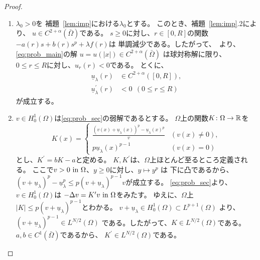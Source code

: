 \begin{proof}
 \begin{enumerate}[1.] \sage
  \item $\lambda_0 > 0$を
        補題~\ref{lem:imp}における$\lambda_0$とする。
        このとき、補題~\ref{lem:imp}.2により、
        $u \in C^{2+\alpha}(\bar{\Omega})$である。
        $s \geq 0$に対し、$r \in [0, R]$の関数
        $-a(r) s + b(r) s^p + \lambda f(r)$は
        単調減少である。したがって、\cite{MR544879}~より、
        \ref{eq:prob_main}の解
        $u = u(\lvert x \rvert) \in C^{2+\alpha}(\bar{\Omega})$
        は球対称解に限り、
        $0 \leq r \leq R$に対し、$u_r (r) < 0$である。
        とくに、
        \begin{align}
         \underline{u}_\lambda(r) & \in C^{2+ \alpha}([0, R]), 
          \label{eq:under_u_r} \\
         \underline{u}_\lambda^\prime(r) &< 0 \ \ (0 \leq r \leq R)
          \label{eq:under_u_r_prime}
        \end{align}
        が成立する。
  \item $v \in H_0^1(\Omega)$は\ref{eq:prob_sec}の弱解であるとする。
        $\Omega$上の関数$K \colon \Omega \to\mathbb{R}$を
        \begin{equation}
         K(x) = \begin{cases}
                 \displaystyle \frac{(v(x) + \underline{u}_\lambda(x))^p -
                 \underline{u}_\lambda(x)^p}{v} & ( v(x) \neq 0 ), \\
                 p \underline{u}_\lambda(x)^{p-1} & ( v(x) = 0 )
                \end{cases}
        \end{equation}
        とし、$K^\prime = b K - a$と定める。
        $K, K^\prime$は、$\Omega$上ほとんど至るところ定義される。
        ここで$v > 0 ~\text{in}~ \Omega$、$y \geq 0$に対し、$y \mapsto y^p$
        は
        下に凸であるから、
        $(v + \underline{u}_\lambda)^p - \underline{u}_\lambda^p \leq
        p(v+ \underline{u}_\lambda)^{p-1} v$が成立する。
        \ref{eq:prob_sec}より、
        $v \in H_0^1(\Omega)$は
        $- \Delta v = K^\prime v ~\text{in}~ \Omega$をみたす。
        ゆえに、$\Omega$上$\lvert K \rvert \leq p
        (v+\underline{u}_\lambda)^{p-1}$とわかる。
        $v + \underline{u}_\lambda \in H_0^1(\Omega) \subset
        L^{p+1}(\Omega)$
        より、$(v + \underline{u}_\lambda)^{p-1} \in L^{N/2}(\Omega)$
        である。したがって、$K \in L^{N/2}(\Omega)$である。
        $a, b \in C^1(\bar{\Omega})$であるから、
        $K^\prime \in L^{N/2}(\Omega)$である。

\end{enumerate}
\end{proof}
